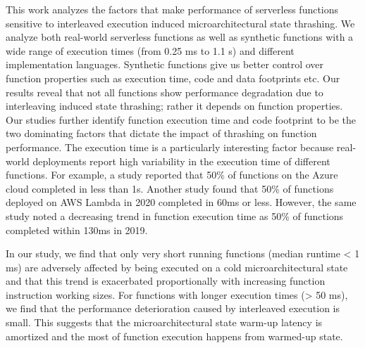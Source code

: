 This work analyzes the factors that make performance of serverless functions sensitive to interleaved execution induced microarchitectural state thrashing. We analyze both real-world serverless functions as well as synthetic functions with a wide range of execution times (from 0.25 ms to 1.1 s) and different implementation languages. Synthetic functions give us better control over function properties such as execution time, code and data footprints etc. Our results reveal that not all functions show performance degradation due to interleaving induced state thrashing; rather it depends on function properties. Our studies further identify function execution time and code footprint to be the two dominating factors that dictate the impact of thrashing on function performance. The execution time is a particularly interesting factor because real-world deployments report high variability in the execution time of different functions. For example, a study \cite{shahrad20_server_wild} reported that 50\% of functions on the Azure cloud completed in less than 1s. Another study \cite{serverless_state} found that 50\% of functions deployed on AWS Lambda in 2020 completed in 60ms or less. However, the same study noted a decreasing trend in function execution time as 50\% of functions completed within 130ms in 2019.



In our study, we find that only very short running functions (median runtime < 1 ms) are adversely affected by being executed on a cold microarchitectural state and that this trend is exacerbated proportionally with increasing function instruction working sizes. For functions with longer execution times (> 50 ms), we find that the performance deterioration caused by interleaved execution is small. This suggests that the microarchitectural state warm-up latency is amortized and the most of function execution happens from warmed-up state.



